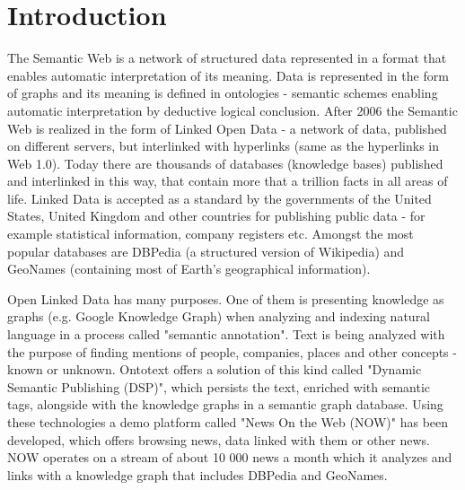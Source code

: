 \chapter{Introduction}
\label{chap:intro}
The Semantic Web is a network of structured data represented in a format that enables automatic interpretation of its meaning. Data is represented in the form of graphs and its meaning is defined in ontologies - semantic schemes enabling automatic interpretation by deductive logical conclusion. After 2006 the Semantic Web is realized in the form of Linked Open Data - a network of data, published on different servers, but interlinked with hyperlinks (same as the hyperlinks in Web 1.0). Today there are thousands of databases (knowledge bases) published and interlinked in this way, that contain more that a trillion facts in all areas of life. Linked Data is accepted as a standard by the governments of the United States, United Kingdom and other countries for publishing public data - for example statistical information, company registers etc. Amongst the most popular databases are DBPedia (a structured version of Wikipedia) and GeoNames (containing most of Earth's geographical information).

Open Linked Data has many purposes. One of them is presenting knowledge as graphs (e.g. Google Knowledge Graph) when analyzing and indexing natural language in a process called "semantic annotation". Text is being analyzed with the purpose of finding mentions of people, companies, places and other concepts - known or unknown. Ontotext offers a solution of this kind called "Dynamic Semantic Publishing (DSP)", which persists the text, enriched with semantic tags, alongside with the knowledge graphs in a semantic graph database. Using these technologies a demo platform called "News On the Web (NOW)" has been developed, which offers browsing news, data linked with them or other news. NOW operates on a stream of about 10 000 news a month which it analyzes and links with a knowledge graph that includes DBPedia and GeoNames.

